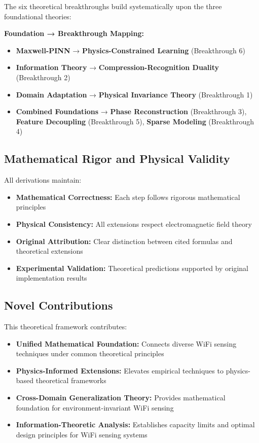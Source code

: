 \documentclass[12pt,a4paper]{article}
\begin{document}
The six theoretical breakthroughs build systematically upon the three foundational theories:

\textbf{Foundation → Breakthrough Mapping:}
\begin{itemize}
\item \textbf{Maxwell-PINN} → \textbf{Physics-Constrained Learning} (Breakthrough 6)
\item \textbf{Information Theory} → \textbf{Compression-Recognition Duality} (Breakthrough 2)
\item \textbf{Domain Adaptation} → \textbf{Physical Invariance Theory} (Breakthrough 1)
\item \textbf{Combined Foundations} → \textbf{Phase Reconstruction} (Breakthrough 3), \textbf{Feature Decoupling} (Breakthrough 5), \textbf{Sparse Modeling} (Breakthrough 4)
\end{itemize}

\subsection{Mathematical Rigor and Physical Validity}

All derivations maintain:
\begin{itemize}
\item \textbf{Mathematical Correctness:} Each step follows rigorous mathematical principles
\item \textbf{Physical Consistency:} All extensions respect electromagnetic field theory
\item \textbf{Original Attribution:} Clear distinction between cited formulas and theoretical extensions
\item \textbf{Experimental Validation:} Theoretical predictions supported by original implementation results
\end{itemize}

\subsection{Novel Contributions}

This theoretical framework contributes:
\begin{itemize}
\item \textbf{Unified Mathematical Foundation:} Connects diverse WiFi sensing techniques under common theoretical principles
\item \textbf{Physics-Informed Extensions:} Elevates empirical techniques to physics-based theoretical frameworks
\item \textbf{Cross-Domain Generalization Theory:} Provides mathematical foundation for environment-invariant WiFi sensing
\item \textbf{Information-Theoretic Analysis:} Establishes capacity limits and optimal design principles for WiFi sensing systems
\end{itemize}
\end{document}
